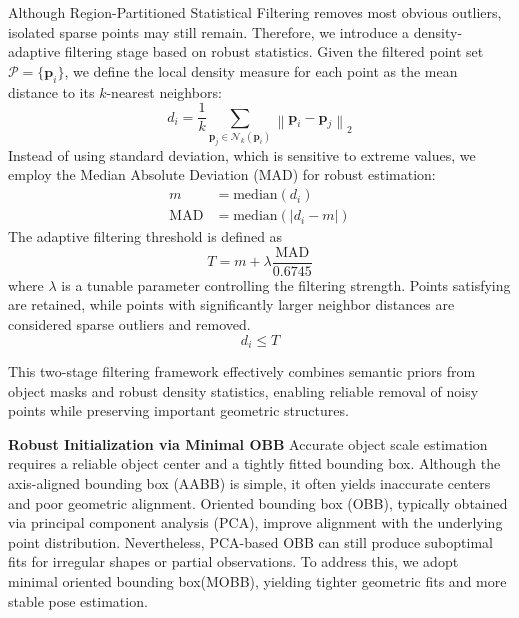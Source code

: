 \documentclass[letterpaper, 10 pt, journal, twoside]{IEEEtran}  %
\begin{document}
  Although Region-Partitioned Statistical Filtering removes most obvious outliers, isolated sparse points may still remain. Therefore, we introduce a density-adaptive filtering stage based on robust statistics.
  Given the filtered point set $\mathcal{P} = \{ \mathbf{p}_i \}$, we define the local density measure for each point as the mean distance to its $k$-nearest neighbors:
  \begin{equation}
  	d_i = \frac{1}{k} \sum_{\mathbf{p}_j \in \mathcal{N}_k(\mathbf{p}_i)} \left\| \mathbf{p}_i - \mathbf{p}_j \right\|_2
  \end{equation}
  Instead of using standard deviation, which is sensitive to extreme values, we employ the Median Absolute Deviation (MAD) for robust estimation:
  \begin{align}
  	m &= \mathrm{median}(d_i) \\
  	\mathrm{MAD} &= \mathrm{median} \left( \left| d_i - m \right| \right)
  \end{align}
  The adaptive filtering threshold is defined as
  \[
  T = m + \lambda \frac{\text{MAD}}{0.6745}
  \]
  where $\lambda$ is a tunable parameter controlling the filtering strength.
  Points satisfying are retained, while points with significantly larger neighbor distances are considered sparse outliers and removed.
  \[
  d_i \leq T
  \]
  
  This two-stage filtering framework effectively combines semantic priors from object masks and robust density statistics, enabling reliable removal of noisy points while preserving important geometric structures.
  
  \textbf{Robust Initialization via Minimal OBB}    
  Accurate object scale estimation requires a reliable object center and a tightly fitted bounding box. 
  Although the axis-aligned bounding box (AABB) is simple, it often yields inaccurate centers and poor geometric alignment. 
  Oriented bounding box (OBB), typically obtained via principal component analysis (PCA), improve alignment with the underlying point distribution. 
  Nevertheless, PCA-based OBB can still produce suboptimal fits for irregular shapes or partial observations.
  To address this, we adopt minimal oriented bounding box(MOBB), yielding tighter geometric fits and more stable pose estimation.
  
\end{document}
